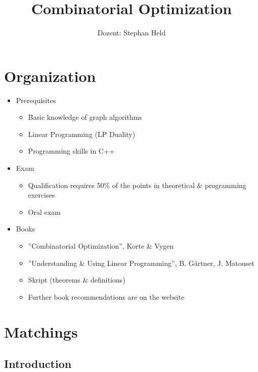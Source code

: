 \documentclass[11pt, a4paper]{article}
\title{Combinatorial Optimization}
\author{Dozent: Stephan Held}
\theoremstyle{remark}
\theoremstyle{definition}
\begin{document}
\maketitle
\tableofcontents
\clearpage

\section{Organization}
\begin{itemize}
	\item Prerequisites
	\begin{itemize}
		\item Basic knowledge of graph algorithms
		\item Linear Programming (LP Duality)
		\item Programming skills in C++
	\end{itemize}

	\item Exam
	\begin{itemize}
		\item Qualification requires 50\% of the points in theoretical \&
		programming exercises
		\item Oral exam
	\end{itemize}

	\item Books
	\begin{itemize}
		\item ''Combinatorial Optimization'', Korte \& Vygen
		\item ''Understanding \& Using Linear Programming'', B. Gärtner,
		J. Matouset
		\item Skript (theorems \& definitions)
		\item Further book recommendations are on the website
	\end{itemize}
\end{itemize}




\section{Matchings}
\subsection{Introduction}
\end{document}
